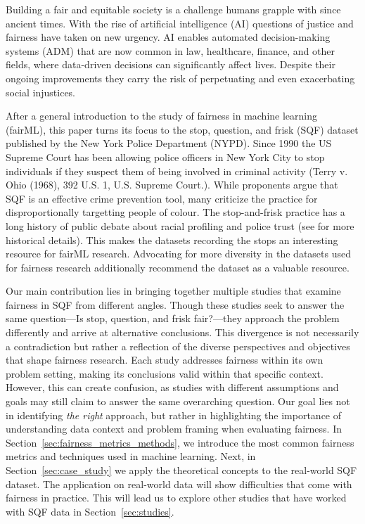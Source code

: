 
Building a fair and equitable society is a challenge humans grapple with since ancient times. With the rise of artificial intelligence (AI) questions of justice and fairness have taken on new urgency. AI enables automated decision-making systems (ADM) that are now common in law, healthcare, finance, and other fields, where data-driven decisions can significantly affect lives. Despite their ongoing improvements they carry the risk of perpetuating and even exacerbating social injustices. 



After a general introduction to the study of fairness in machine learning (fairML), this paper turns its focus to the stop, question, and frisk (SQF) dataset published by the New York Police Department (NYPD). Since 1990 the US Supreme Court has been allowing police officers in New York City to stop individuals if they suspect them of being involved in criminal activity (Terry v. Ohio (1968), 392 U.S. 1, U.S. Supreme Court.). While proponents argue that SQF is an effective crime prevention tool, many criticize the practice for disproportionally targetting people of colour. The stop-and-frisk practice has a long history of public debate about racial profiling and police trust (see \cite{gelman2007} for more historical details). This makes the datasets recording the stops an interesting resource for fairML research.
Advocating for more diversity in the datasets used for fairness research additionally \cite{Fabris_2022} recommend the dataset as a valuable resource.

Our main contribution lies in bringing together multiple studies that examine fairness in SQF from different angles. Though these studies seek to answer the same question—Is stop, question, and frisk fair?—they approach the problem differently and arrive at alternative conclusions.
This divergence is not necessarily a contradiction but rather a reflection of the diverse perspectives and objectives that shape fairness research. Each study addresses fairness within its own problem setting, making its conclusions valid within that specific context. However, this can create confusion, as studies with different assumptions and goals may still claim to answer the same overarching question. Our goal lies not in identifying \textit{the right} approach, but rather in highlighting the importance of understanding data context and problem framing when evaluating fairness.
In Section~\ref{sec:fairness_metrics_methods}, we introduce the most common fairness metrics and techniques used in machine learning.
Next, in Section~\ref{sec:case_study} we apply the theoretical concepts to the real-world SQF dataset. 
The application on real-world data will show difficulties that come with fairness in practice.
This will lead us to explore other studies that have worked with SQF data in Section~\ref{sec:studies}. 


